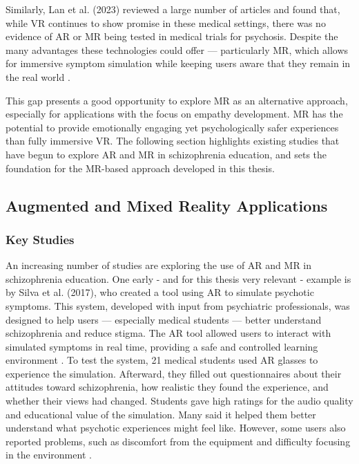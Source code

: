 Similarly, Lan et al. (2023) reviewed a large number of articles and found that, while VR continues to show promise in these medical settings, there was no evidence of AR or MR being tested in medical trials for psychosis. Despite the many advantages these technologies could offer — particularly MR, which allows for immersive symptom simulation while keeping users aware that they remain in the real world \cite{Lan2023}.

This gap presents a good opportunity to explore MR as an alternative approach, especially for applications with the focus on empathy development. MR has the potential to provide emotionally engaging yet psychologically safer experiences than fully immersive VR. The following section highlights existing studies that have begun to explore AR and MR in schizophrenia education, and sets the foundation for the MR-based approach developed in this thesis.


\subsection{Augmented and Mixed Reality Applications}
\subsubsection{Key Studies}
\label{sec:keystudies}

An increasing number of studies are exploring the use of AR and MR in schizophrenia education. One early - and for this thesis very relevant - example is by Silva et al. (2017), who created a tool using AR to simulate psychotic symptoms. This system, developed with input from psychiatric professionals, was designed to help users — especially medical students — better understand schizophrenia and reduce stigma. The AR tool allowed users to interact with simulated symptoms in real time, providing a safe and controlled learning environment \cite{Silva2017}. To test the system, 21 medical students used AR glasses to experience the simulation. Afterward, they filled out questionnaires about their attitudes toward schizophrenia, how realistic they found the experience, and whether their views had changed. Students gave high ratings for the audio quality and educational value of the simulation. Many said it helped them better understand what psychotic experiences might feel like. However, some users also reported problems, such as discomfort from the equipment and difficulty focusing in the environment \cite{Silva2017}.


